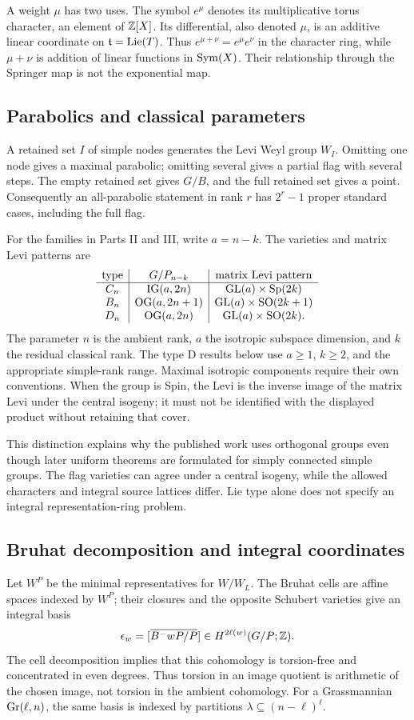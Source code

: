 A weight $\mu$ has two uses. The symbol $e^\mu$ denotes its multiplicative torus character, an element of $\mathbb Z[X]$. Its differential, also denoted $\mu$, is an additive linear coordinate on $\mathfrak t=\operatorname{Lie}(T)$. Thus $e^{\mu+\nu}=e^\mu e^\nu$ in the character ring, while $\mu+\nu$ is addition of linear functions in $\operatorname{Sym}(X)$. Their relationship through the Springer map is not the exponential map.

\subsection{Parabolics and classical parameters}
A retained set $I$ of simple nodes generates the Levi Weyl group $W_I$. Omitting one node gives a maximal parabolic; omitting several gives a partial flag with several steps. The empty retained set gives $G/B$, and the full retained set gives a point. Consequently an all-parabolic statement in rank $r$ has $2^r-1$ proper standard cases, including the full flag.

For the families in Parts II and III, write $a=n-k$. The varieties and matrix Levi patterns are
\[
\begin{array}{c|c|c}
\text{type}&G/P_{n-k}&\text{matrix Levi pattern}\\\hline
C_n&\operatorname{IG}(a,2n)&\operatorname{GL}(a)\times\operatorname{Sp}(2k)\\
B_n&\operatorname{OG}(a,2n+1)&\operatorname{GL}(a)\times\operatorname{SO}(2k+1)\\
D_n&\operatorname{OG}(a,2n)&\operatorname{GL}(a)\times\operatorname{SO}(2k).
\end{array}
\]
The parameter $n$ is the ambient rank, $a$ the isotropic subspace dimension, and $k$ the residual classical rank. The type D results below use $a\ge1$, $k\ge2$, and the appropriate simple-rank range. Maximal isotropic components require their own conventions. When the group is Spin, the Levi is the inverse image of the matrix Levi under the central isogeny; it must not be identified with the displayed product without retaining that cover.

This distinction explains why the published work uses orthogonal groups even though later uniform theorems are formulated for simply connected simple groups. The flag varieties can agree under a central isogeny, while the allowed characters and integral source lattices differ. Lie type alone does not specify an integral representation-ring problem.

\subsection{Bruhat decomposition and integral coordinates}
Let $W^P$ be the minimal representatives for $W/W_L$. The Bruhat cells are affine spaces indexed by $W^P$; their closures and the opposite Schubert varieties give an integral basis
\[
 \epsilon_w=[\overline{B^-wP/P}]\in H^{2\ell(w)}(G/P;\mathbb Z).
\]
The cell decomposition implies that this cohomology is torsion-free and concentrated in even degrees. Thus torsion in an image quotient is arithmetic of the chosen image, not torsion in the ambient cohomology. For a Grassmannian $\operatorname{Gr}(\ell,n)$, the same basis is indexed by partitions $\lambda\subseteq(n-\ell)^\ell$.

